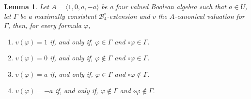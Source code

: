 \documentclass{amsart}
\newtheorem{lemma}{Lemma}[section]
\newcommand{\pair}[1]{\langle #1 \rangle}
\newcommand{\B}{$\mathcal{B}_4^\circ$}
\begin{document}
\begin{lemma}\label{conservation-values-10-classical}
    Let $A = \pair{1, 0, a, -a}$ be a four valued Boolean algebra such that $a \in U$, let $\Gamma$ be a maximally consistent \B-extension and $v$ the $A$-canonical valuation for $\Gamma$, then, for every formula $\varphi$,
    \begin{enumerate}
        \item $v(\varphi) = 1$ if, and only if, $\varphi \in \Gamma$ and $\circ \varphi \in \Gamma$.
        \item $v(\varphi) = 0$ if, and only if, $\varphi \notin \Gamma$ and $\circ \varphi \in \Gamma$.
        \item $v(\varphi) = a$ if, and only if, $\varphi \in \Gamma$ and $\circ \varphi \notin \Gamma$.
        \item $v(\varphi) = -a$ if, and only if, $\varphi \notin \Gamma$ and $\circ \varphi \notin \Gamma$.
    \end{enumerate}
\end{lemma}
\end{document}
